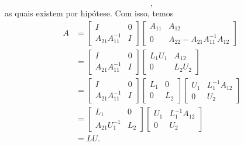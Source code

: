 \documentclass[leqno]{article}
\numberwithin{equation}{section}
\begin{document}
\begin{sol}
\begin{equation*}
            ,\end{equation*}
            as quais existem por hipótese.
            Com isso, temos
            \begin{align*}
                A &=
                \begin{bmatrix}
                    I & 0 \\
                    A_{ 21 } A_{ 11 }^{ -1 } & I
                \end{bmatrix}
                \begin{bmatrix}
                    A_{ 11 } & A_{ 12 } \\
                    0 & A_{ 22 } - A_{ 21 } A_{ 11 }^{ -1 } A_{ 12 }
                \end{bmatrix} \\
                  &= 
                  \begin{bmatrix}
                      I & 0 \\
                      A_{ 21 } A_{ 11 }^{ -1 } & I
                  \end{bmatrix}
                  \begin{bmatrix}
                      L_{ 1 } U_{ 1 } & A_{ 12 } \\
                      0 & L_{ 2 } U_{ 2 }
                  \end{bmatrix} \\
                  &= 
                  \begin{bmatrix}
                      I & 0 \\
                      A_{ 21 } A_{ 11 }^{ -1 } & I
                  \end{bmatrix}
                  \begin{bmatrix}
                      L_{ 1 } & 0 \\
                      0 & L_{ 2 }
                  \end{bmatrix}
                  \begin{bmatrix}
                      U_{ 1 } & L_{ 1 }^{ -1 } A_{ 12 } \\
                      0 & U_{ 2 }
                  \end{bmatrix} \\
                  &=
                  \begin{bmatrix}
                      L_{ 1 } & 0 \\
                      A_{ 21 } U_{ 1 }^{ -1 } & L_{ 2 }
                  \end{bmatrix}
                  \begin{bmatrix}
                      U_{ 1 } & L_{ 1 }^{ -1 } A_{ 12 } \\
                      0 & U_{ 2 }
                  \end{bmatrix} \\
                  &= LU
              .\end{align*}
          \end{sol} 

          
\end{document}
